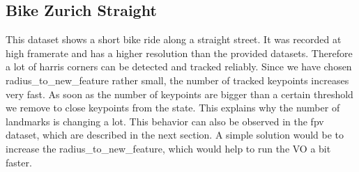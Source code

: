 \documentclass{article}
\begin{document}

\subsection{Bike Zurich Straight}

This dataset shows a short bike ride along a straight street. It was recorded at high framerate and has a higher resolution than the provided datasets. Therefore a lot of harris corners can be detected and tracked reliably. Since we have chosen radius\_to\_new\_feature rather small, the number of tracked keypoints increases very fast. As soon as the number of keypoints are bigger than a certain threshold we remove to close keypoints from the state. This explains why the number of landmarks is changing a lot. This behavior can also be observed in the fpv dataset, which are described in the next section. A simple solution would be to increase the  radius\_to\_new\_feature, which would help to run the VO a bit faster.
\end{document}
